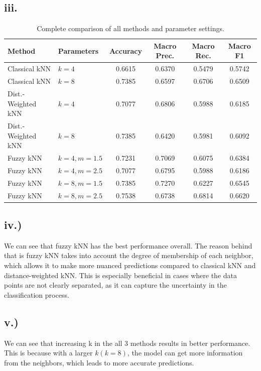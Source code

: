 \documentclass[12pt,a4paper]{article}
\begin{document}
\subsection*{iii.}

\begin{table}[h]
\centering
\begin{tabular}{llcccc}
\toprule
\textbf{Method} & \textbf{Parameters} & \textbf{Accuracy} & \textbf{Macro Prec.} & \textbf{Macro Rec.} & \textbf{Macro F1} \\
\midrule
Classical kNN & $k=4$ & 0.6615 & 0.6370 & 0.5479 & 0.5742 \\
Classical kNN & $k=8$ & 0.7385 & 0.6597 & 0.6706 & 0.6509 \\
\midrule
Dist.-Weighted kNN & $k=4$ & 0.7077 & 0.6806 & 0.5988 & 0.6185 \\
Dist.-Weighted kNN & $k=8$ & 0.7385 & 0.6420 & 0.5981 & 0.6092 \\
\midrule
Fuzzy kNN & $k=4, m=1.5$ & 0.7231 & 0.7069 & 0.6075 & 0.6384 \\
Fuzzy kNN & $k=4, m=2.5$ & 0.7077 & 0.6795 & 0.5988 & 0.6186 \\
Fuzzy kNN & $k=8, m=1.5$ & 0.7385 & 0.7270 & 0.6227 & 0.6545 \\
Fuzzy kNN & $k=8, m=2.5$ & 0.7538 & 0.6738 & 0.6814 & 0.6620 \\
\bottomrule
\end{tabular}
\caption{Complete comparison of all methods and parameter settings.}
\end{table}

\subsection*{iv.)}

We can see that fuzzy kNN has the best performance overall. The reason behind that is fuzzy kNN takes into account the degree of membership of each neighbor, which allows it to make more nuanced predictions compared to classical kNN and distance-weighted kNN. This is especially beneficial in cases where the data points are not clearly separated, as it can capture the uncertainty in the classification process.

\subsection*{v.)}

We can see that increasing k in the all 3 methods results in better performance. This is because with a larger $k(k=8)$, the model can get more information from the neighbors, which leads to more accurate predictions.
\end{document}
